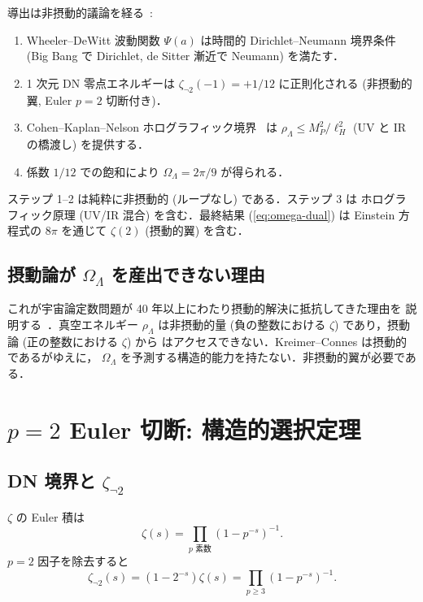 \documentclass[11pt,a4paper]{article}
\begin{document}
導出は非摂動的議論を経る~\cite{wb-wdw}:

\begin{enumerate}
\item Wheeler--DeWitt 波動関数 $\Psi(a)$ は時間的 Dirichlet--Neumann
境界条件 (Big Bang で Dirichlet, de Sitter 漸近で Neumann) を満たす．
\item 1 次元 DN 零点エネルギーは $\zeta_{\neg 2}(-1) = +1/12$ に正則化される
(非摂動的翼, Euler $p = 2$ 切断付き)．
\item Cohen--Kaplan--Nelson ホログラフィック境界~\cite{CKN1999} は
$\rho_\Lambda \leq M_P^2/\ell_H^2$ (UV と IR の橋渡し) を提供する．
\item 係数 $1/12$ での飽和により $\Omega_\Lambda = 2\pi/9$ が得られる．
\end{enumerate}

ステップ 1--2 は純粋に非摂動的 (ループなし) である．ステップ 3 は
ホログラフィック原理 (UV/IR 混合) を含む．最終結果 (\ref{eq:omega-dual}) は
Einstein 方程式の $8\pi$ を通じて $\zeta(2)$ (摂動的翼) を含む．

\subsection{摂動論が $\Omega_\Lambda$ を産出できない理由}

これが宇宙論定数問題が 40 年以上にわたり摂動的解決に抵抗してきた理由を
説明する~\cite{Weinberg1989}．真空エネルギー $\rho_\Lambda$ は非摂動的量
(負の整数における $\zeta$) であり，摂動論 (正の整数における $\zeta$) から
はアクセスできない．Kreimer--Connes は摂動的であるがゆえに，
$\Omega_\Lambda$ を予測する構造的能力を持たない．非摂動的翼が必要である．

\section{$p = 2$ Euler 切断: 構造的選択定理}

\subsection{DN 境界と $\zeta_{\neg 2}$}

$\zeta$ の Euler 積は
\begin{equation}
\zeta(s) = \prod_{p\text{ 素数}} (1 - p^{-s})^{-1}.
\end{equation}
$p = 2$ 因子を除去すると
\begin{equation}
\zeta_{\neg 2}(s) = (1 - 2^{-s})\zeta(s)
= \prod_{p \geq 3} (1 - p^{-s})^{-1}.
\end{equation}
\end{document}
